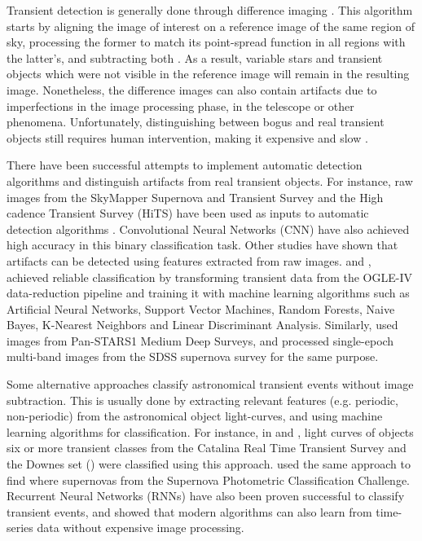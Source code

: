 \documentclass[a4paper,fleqn,usenatbib]{mnras}
\begin{document}
Transient detection is generally done through 
difference imaging \citep{1507.05137,1608.01733,1708.02850}. 
This algorithm starts by aligning the image of interest on a reference image of the
same region of sky, processing the former to match its point-spread
function in all regions with the latter's, and subtracting both
\citep{astro-ph/9712287}. 
As a result, variable stars and transient objects which were not
visible in the reference image will remain in the resulting
image. 
Nonetheless, the difference images can also contain
artifacts due to imperfections in the image processing
phase, in the telescope or other phenomena. 
Unfortunately, distinguishing between bogus and real transient objects
still requires human intervention, making it expensive and slow
\citep{2011arXiv1110.4655D}.  


There have been successful attempts to implement automatic detection
algorithms and distinguish artifacts from real transient
objects.  
For instance, raw images from the  SkyMapper Supernova and Transient
Survey and the High cadence Transient Survey (HiTS) have been used as
inputs to automatic detection algorithms \citep{1708.08947,1701.00458}.
Convolutional Neural Networks (CNN) have also achieved
high accuracy in this binary classification task.
Other studies have shown that artifacts can be detected using
features extracted from raw images. 
\cite{1601.06151} and \cite{1601.06320}, achieved reliable
classification by transforming transient data from the OGLE-IV
data-reduction pipeline and training it with machine learning
algorithms such as Artificial Neural Networks, Support Vector
Machines, Random Forests, Naive Bayes, K-Nearest Neighbors and Linear
Discriminant Analysis.  
Similarly, \cite{1501.05470} used images from Pan-STARS1 Medium Deep
Surveys, and \cite{1407.4118} processed single-epoch multi-band images
from the SDSS supernova survey for the same purpose.  



Some alternative approaches classify astronomical transient
events without image subtraction.
This is usually done by extracting relevant features (e.g. periodic,
non-periodic) from the astronomical object light-curves, and using
machine learning algorithms for classification. 
For instance, in \cite{1401.3211} and \cite{1601.03931}, light curves
of objects six or more transient classes from the Catalina Real Time
Transient Survey and the Downes set (\cite{d05}) were
classified using this approach.
\cite{1603.00882} used the same approach to find
where supernovas from the Supernova Photometric Classification
Challenge.
Recurrent Neural Networks (RNNs) have also been proven successful to
classify transient events, \cite{1606.07442} and \cite{1710.06804}
showed that  modern algorithms can also learn from time-series data
without expensive image processing.    
\end{document}
